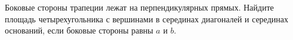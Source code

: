 \begin{ex}
	\begin{condition}
		Боковые стороны трапеции лежат на перпендикулярных прямых. Найдите площадь четырехугольника с вершинами	в серединах диагоналей и серединах оснований, если боковые	стороны равны \( a  \) и \( b \).
	\end{condition}
\end{ex}